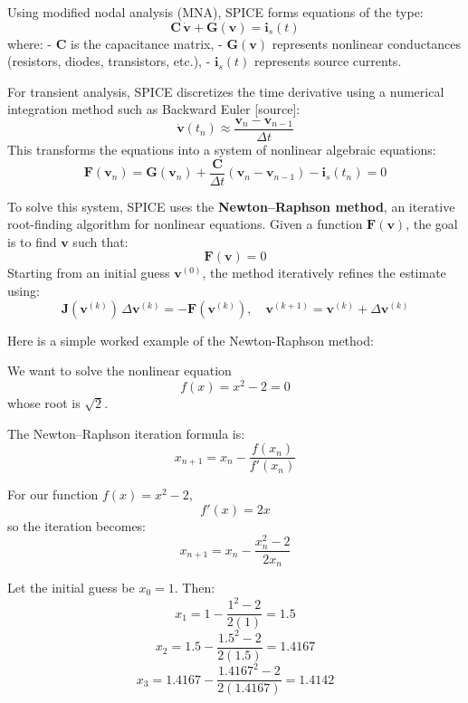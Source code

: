 \documentclass[a4paper,12pt]{article}
\begin{document}
Using modified nodal analysis (MNA), SPICE forms equations of the type:
\begin{equation}
\mathbf{C} \, \dot{\mathbf{v}} + \mathbf{G}(\mathbf{v}) = \mathbf{i}_s(t)
\end{equation}
where:
- \(\mathbf{C}\) is the capacitance matrix,  
- \(\mathbf{G}(\mathbf{v})\) represents nonlinear conductances (resistors, diodes, transistors, etc.),  
- \(\mathbf{i}_s(t)\) represents source currents.

For transient analysis, SPICE discretizes the time derivative using a numerical integration method such as Backward Euler [source]:
\[
\dot{\mathbf{v}}(t_n) \approx \frac{\mathbf{v}_n - \mathbf{v}_{n-1}}{\Delta t}
\]
This transforms the equations into a system of nonlinear algebraic equations:
\begin{equation}
\mathbf{F}(\mathbf{v}_n) = \mathbf{G}(\mathbf{v}_n) + \frac{\mathbf{C}}{\Delta t} (\mathbf{v}_n - \mathbf{v}_{n-1}) - \mathbf{i}_s(t_n) = 0
\end{equation}

To solve this system, SPICE uses the \textbf{Newton–Raphson method}, an iterative root-finding algorithm for nonlinear equations. Given a function \(\mathbf{F}(\mathbf{v})\), the goal is to find \(\mathbf{v}\) such that:
\begin{equation}
\mathbf{F}(\mathbf{v}) = 0
\end{equation}
Starting from an initial guess \(\mathbf{v}^{(0)}\), the method iteratively refines the estimate using:
\[
\mathbf{J}(\mathbf{v}^{(k)}) \, \Delta \mathbf{v}^{(k)} = -\mathbf{F}(\mathbf{v}^{(k)}), \quad
\mathbf{v}^{(k+1)} = \mathbf{v}^{(k)} + \Delta \mathbf{v}^{(k)}
\]

Here is a simple worked example of the Newton-Raphson method:

We want to solve the nonlinear equation
\begin{equation}
f(x) = x^2 - 2 = 0
\end{equation}
whose root is \(\sqrt{2}\).

The Newton–Raphson iteration formula is:
\[
x_{n+1} = x_n - \frac{f(x_n)}{f'(x_n)}
\]

For our function \(f(x) = x^2 - 2\),
\[
f'(x) = 2x
\]
so the iteration becomes:
\[
x_{n+1} = x_n - \frac{x_n^2 - 2}{2x_n}
\]

Let the initial guess be \(x_0 = 1\). Then:
\[
x_1 = 1 - \frac{1^2 - 2}{2(1)} = 1.5
\]
\[
x_2 = 1.5 - \frac{1.5^2 - 2}{2(1.5)} = 1.4167
\]
\[
x_3 = 1.4167 - \frac{1.4167^2 - 2}{2(1.4167)} = 1.4142
\]
\end{document}
